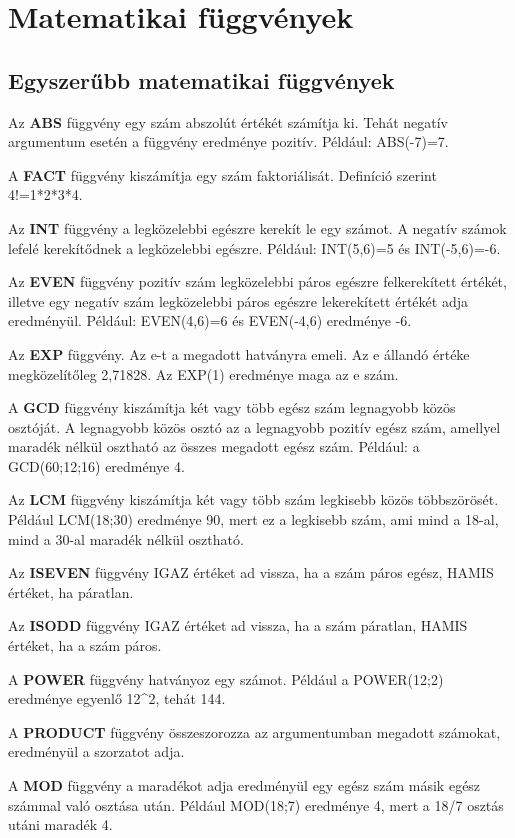 \chapter{Matematikai függvények}
\thispagestyle{empty}

\section{Egyszerűbb matematikai függvények}

Az \textbf{ABS} függvény egy szám abszolút értékét
számítja ki. Tehát negatív argumentum esetén a függvény
eredménye pozitív. Például: ABS(-7)=7.

A \textbf{FACT} függvény kiszámítja egy szám
faktoriálisát. Definíció szerint 4!=1*2*3*4.

Az \textbf{INT} függvény a legközelebbi egészre kerekít le egy
számot. A negatív számok lefelé kerekítődnek a
legközelebbi egészre. Például: INT(5,6)=5 és  INT(-5,6)=-6.

Az \textbf{EVEN} függvény pozitív szám legközelebbi páros
egészre felkerekített értékét, illetve egy negatív szám
legközelebbi páros egészre lekerekített értékét adja
eredményül. Például: EVEN(4,6)=6 és  EVEN(-4,6) eredménye
-6.

Az \textbf{EXP} függvény. Az e-t a megadott hatványra emeli. Az e
állandó értéke megközelítőleg 2,71828. Az EXP(1)
eredménye maga az e szám.

A \textbf{GCD} függvény kiszámítja két vagy több egész
szám legnagyobb közös osztóját. A legnagyobb közös
osztó az a legnagyobb pozitív egész szám, amellyel maradék
nélkül osztható az összes megadott egész szám. Például:
a GCD(60;12;16) eredménye 4.

Az \textbf{LCM} függvény kiszámítja két vagy több szám
legkisebb közös többszörösét. Például LCM(18;30)
eredménye 90, mert ez a legkisebb szám, ami mind a 18-al, mind a
30-al maradék nélkül osztható.

Az \textbf{ISEVEN} függvény IGAZ értéket ad vissza, ha a szám
páros egész, HAMIS értéket, ha páratlan.

Az \textbf{ISODD} függvény IGAZ értéket ad vissza, ha a szám
páratlan, HAMIS értéket, ha a szám páros.

A \textbf{POWER} függvény hatványoz egy számot. Például a
POWER(12;2) eredménye egyenlő 12\^{}2, tehát 144.

A \textbf{PRODUCT} függvény összeszorozza az argumentumban
megadott számokat, eredményül a szorzatot adja.

A \textbf{MOD} függvény a maradékot adja eredményül egy
egész szám másik egész számmal való osztása után.
Például MOD(18;7) eredménye 4, mert a 18/7 osztás utáni
maradék 4.

